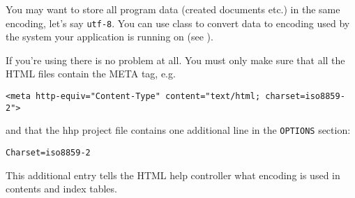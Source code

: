 
You may want to store all program data (created documents etc.) in
the same encoding, let's say {\tt utf-8}. You can use
 class to convert data to encoding used by the
system your application is running on (see
).


If you're using  there is
no problem at all. You must only make sure that all the HTML files contain
the META tag, e.g.

\begin{verbatim}
<meta http-equiv="Content-Type" content="text/html; charset=iso8859-2">
\end{verbatim}

and that the hhp project file contains one additional line in the {\tt OPTIONS}
section:

\begin{verbatim}
Charset=iso8859-2
\end{verbatim}

This additional entry tells the HTML help controller what encoding is used
in contents and index tables.

